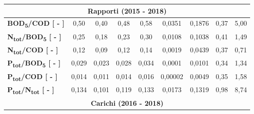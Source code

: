 \begin{sidewaystable}[h]
\begin{center}
\begin{tabular}{l|c|c|c|c|c|c|c|c|}
		\multicolumn{9}{|c|}{\textbf{Rapporti (2015 - 2018)}}                                                                                                                                                                                                                                       \\ \hline
		\multicolumn{1}{|l|}{\textbf{BOD\textsubscript{5}/COD {[} - {]}}}       &  0,50 & 0,40 & 0,48 & 0,58 & 0,0351 & 0,1876 & 0,37 & 5,00 \\ \hline
		\multicolumn{1}{|l|}{\textbf{N\textsubscript{tot}/BOD\textsubscript{5} {[} - {]}}}      & 0,25                      & 0,18                     & 0,23                      & 0,30                      & 0,0108                      & 0,1038                      & 0,41                      & 1,49                      \\ \hline
		\multicolumn{1}{|l|}{\textbf{N\textsubscript{tot}/COD {[} - {]}}}       & 0,12                      & 0,09                      & 0,12                      & 0,14                      & 0,0019                      & 0,0439                      & 0,37                      & 0,71                      \\ \hline
		\multicolumn{1}{|l|}{\textbf{P\textsubscript{tot}/BOD\textsubscript{5} {[} - {]}}}      & 0,029                     & 0,023                     & 0,028                     & 0,034                     & 0,0001                      & 0,0101                      & 0,34                      & 1,34                      \\ \hline
		\multicolumn{1}{|l|}{\textbf{P\textsubscript{tot}/COD {[} - {]}}}       & 0,014                     & 0,011                     & 0,014                     & 0,016                     & 0,00002                     & 0,0049                      & 0,35                      & 1,58                      \\ \hline
		\multicolumn{1}{|l|}{\textbf{P\textsubscript{tot}/N\textsubscript{tot} {[} - {]}}}      & 0,134                     & 0,101                     & 0,119                     & 0,133                     & 0,0173                      & 0,1319                      & 0,98                      & 8,74                      \\ \hline
		\multicolumn{9}{|c|}{\textbf{Carichi (2016 - 2018)}}                                                                                                                                                                                                                                        \\ \hline

\end{tabular}
\end{center}
\end{sidewaystable}
